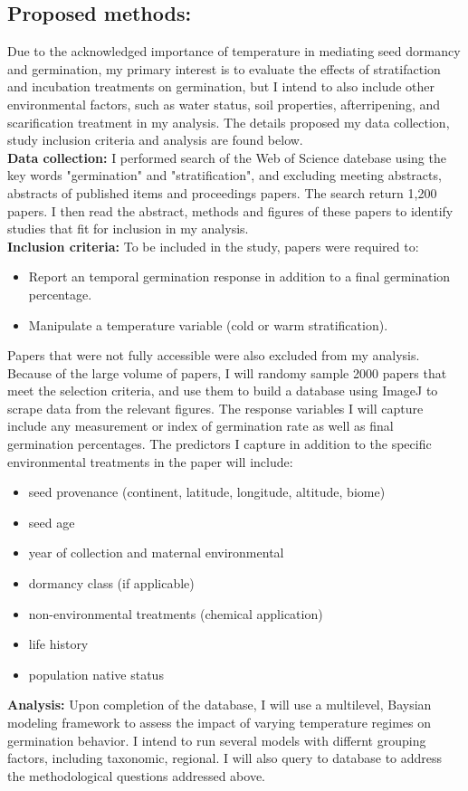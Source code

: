 \documentclass{article}\usepackage[]{graphicx}\usepackage[]{color}
\begin{document}
\subsection*{Proposed methods:}
\indent Due to the acknowledged importance of temperature in mediating seed dormancy and germination, my primary interest is to evaluate the effects of stratifaction and incubation treatments on germination, but I intend to also include other environmental factors, such as water status, soil properties, afterripening, and scarification treatment in my analysis. The details proposed my data collection, study inclusion criteria and analysis are found below.\\
\textbf{Data collection:} I performed search of the Web of Science datebase using the key words "germination" and "stratification", and excluding meeting abstracts, abstracts of published items and proceedings papers. The search return 1,200 papers. I then read the abstract, methods and figures of these papers to identify studies that fit for inclusion in my analysis.\\
\textbf{Inclusion criteria:} To be included in the study, papers were required to:
\begin{itemize}
\item Report an temporal germination response in addition to a final germination percentage.
\item Manipulate a temperature variable (cold or warm stratification).
\end{itemize}
\indent Papers that were not fully accessible were also excluded from my analysis. Because of the large volume of papers, I will randomy sample 2000 papers that meet the selection criteria, and use them to build a database using ImageJ to scrape data from the relevant figures. The response variables I will capture include any measurement or index of germination rate as well as final germination percentages. The predictors I capture in addition to the specific environmental treatments in the paper will include:
\begin{itemize}
\item seed provenance (continent, latitude, longitude, altitude, biome)
\item seed age
\item year of collection and maternal environmental
\item dormancy class (if applicable)
\item non-environmental treatments (chemical application)
\item life history
\item population native status
\end{itemize}
\textbf{Analysis:} Upon completion of the database, I will use a multilevel, Baysian modeling framework to assess the impact of varying temperature regimes on germination behavior. I intend to run several models with differnt grouping factors, including taxonomic, regional. I will also query to database to address the methodological questions addressed above.
\end{document}
